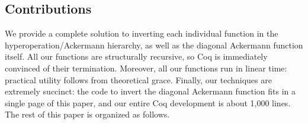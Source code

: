 \subsection{Contributions}
We provide a complete solution to inverting each individual function in the hyperoperation/Ackermann hierarchy,
as well as the diagonal Ackermann function itself.  All our functions are structurally recursive, so
Coq is immediately convinced of their termination.  Moreover, all our functions run in linear time: practical utility follows from theoretical grace.
Finally, our techniques are extremely succinct: the code to invert the diagonal Ackermann function fits in a single page of this paper, and our entire Coq development is about 1,000 lines. The rest of this paper is organized as follows.
